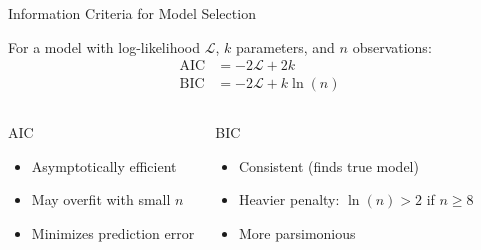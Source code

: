 \documentclass[9pt, aspectratio=169, t]{beamer}
\begin{document}
\begin{frame}{Information Criteria for Model Selection}
    \begin{defn}
        For a model with log-likelihood $\mathcal{L}$, $k$ parameters, and $n$ observations:
        \begin{align*}
            \text{AIC} &= -2\mathcal{L} + 2k \\
            \text{BIC} &= -2\mathcal{L} + k \ln(n)
        \end{align*}
    \end{defn}

    \vspace{0.2cm}

    \begin{columns}[T]
        \begin{exampleblock}{AIC}
            \begin{itemize}
                \item Asymptotically efficient
                \item May overfit with small $n$
                \item Minimizes prediction error
            \end{itemize}
        \end{exampleblock}

        \begin{block}{BIC}
            \begin{itemize}
                \item Consistent (finds true model)
                \item Heavier penalty: $\ln(n) > 2$ if $n \geq 8$
                \item More parsimonious
            \end{itemize}
        \end{block}
    \end{columns}
\end{frame}
\end{document}
